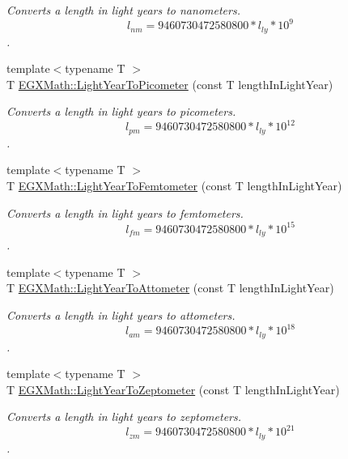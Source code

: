 \begin{DoxyCompactItemize}
\begin{DoxyCompactList}\small\item\em Converts a length in light years to nanometers. \[ l_{nm}=9460730472580800 * l_{ly} * 10^{9} \]. \end{DoxyCompactList}\item 
{\footnotesize template$<$typename T $>$ }\\T \mbox{\hyperlink{group___e_g_x_math-_conversions-_length_conversions-_astronomical-_light_year-_s_i_ga6dc5dc3c9584f578c4a935552fb965b7}{E\+G\+X\+Math\+::\+Light\+Year\+To\+Picometer}} (const T length\+In\+Light\+Year)
\begin{DoxyCompactList}\small\item\em Converts a length in light years to picometers. \[ l_{pm}=9460730472580800 * l_{ly} * 10^{12} \]. \end{DoxyCompactList}\item 
{\footnotesize template$<$typename T $>$ }\\T \mbox{\hyperlink{group___e_g_x_math-_conversions-_length_conversions-_astronomical-_light_year-_s_i_ga5b812ad19216d3cf0e9da61009445cbf}{E\+G\+X\+Math\+::\+Light\+Year\+To\+Femtometer}} (const T length\+In\+Light\+Year)
\begin{DoxyCompactList}\small\item\em Converts a length in light years to femtometers. \[ l_{fm}=9460730472580800 * l_{ly} * 10^{15} \]. \end{DoxyCompactList}\item 
{\footnotesize template$<$typename T $>$ }\\T \mbox{\hyperlink{group___e_g_x_math-_conversions-_length_conversions-_astronomical-_light_year-_s_i_ga3610878361df6a45432eb294c527cdfa}{E\+G\+X\+Math\+::\+Light\+Year\+To\+Attometer}} (const T length\+In\+Light\+Year)
\begin{DoxyCompactList}\small\item\em Converts a length in light years to attometers. \[ l_{am}=9460730472580800 * l_{ly} * 10^{18} \]. \end{DoxyCompactList}\item 
{\footnotesize template$<$typename T $>$ }\\T \mbox{\hyperlink{group___e_g_x_math-_conversions-_length_conversions-_astronomical-_light_year-_s_i_ga9edab3e87135a70649bc16d6118f5614}{E\+G\+X\+Math\+::\+Light\+Year\+To\+Zeptometer}} (const T length\+In\+Light\+Year)
\begin{DoxyCompactList}\small\item\em Converts a length in light years to zeptometers. \[ l_{zm}=9460730472580800 * l_{ly} * 10^{21} \]. \end{DoxyCompactList}\item 

\end{DoxyCompactItemize}
